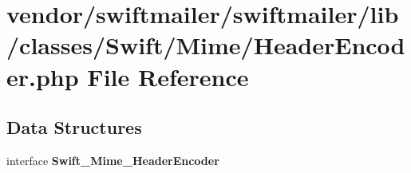 \section{vendor/swiftmailer/swiftmailer/lib/classes/\+Swift/\+Mime/\+Header\+Encoder.php File Reference}
\label{_header_encoder_8php}
\subsection*{Data Structures}
\begin{DoxyCompactItemize}
\item 
interface {\bf Swift\+\_\+\+Mime\+\_\+\+Header\+Encoder}
\end{DoxyCompactItemize}
